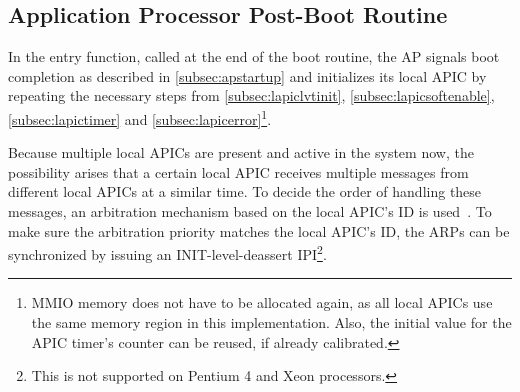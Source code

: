 \subsection{Application Processor Post-Boot Routine}
\label{subsec:apsystementry}

In the entry function, called at the end of the boot routine, the AP signals boot completion as described in \autoref{subsec:apstartup} and initializes its local APIC by repeating the necessary steps from \autoref{subsec:lapiclvtinit}, \autoref{subsec:lapicsoftenable}, \autoref{subsec:lapictimer} and \autoref{subsec:lapicerror}\footnote{
  MMIO memory does not have to be allocated again, as all local APICs use the same memory region in this implementation.
  Also, the initial value for the APIC timer's counter can be reused, if already calibrated.}.

Because multiple local APICs are present and active in the system now, the possibility arises that a certain local APIC receives multiple messages from different local APICs at a similar time.
To decide the order of handling these messages, an arbitration mechanism based on the local APIC's ID is used~\autocite[sec.~3.11.7]{ia32}.
To make sure the arbitration priority matches the local APIC's ID, the ARPs can be synchronized by issuing an INIT-level-deassert IPI\footnote{
  This is not supported on Pentium 4 and Xeon processors.}.

\cleardoublepage